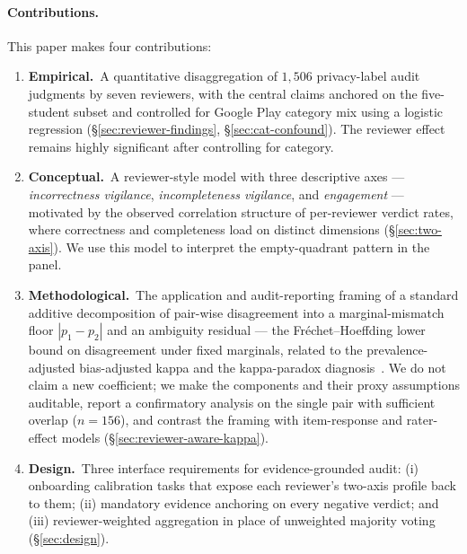 \documentclass[11pt,a4paper]{article}
\begin{document}
\paragraph{Contributions.}
This paper makes four contributions:
%
\begin{enumerate}[leftmargin=*,topsep=2pt,itemsep=2pt]
\item \textbf{Empirical.}\ A quantitative disaggregation of $1{,}506$
       privacy-label audit judgments by seven reviewers, with the
       central claims anchored on the five-student subset and
       controlled for Google Play category mix using a logistic
       regression (\S\ref{sec:reviewer-findings},
       \S\ref{sec:cat-confound}). The reviewer effect remains highly
       significant after controlling for category.
\item \textbf{Conceptual.}\ A reviewer-style model with three
       descriptive axes --- \emph{incorrectness vigilance},
       \emph{incompleteness vigilance}, and \emph{engagement} ---
       motivated by the observed correlation structure of per-reviewer
       verdict rates, where correctness and completeness load on
       distinct dimensions (\S\ref{sec:two-axis}). We use this model
       to interpret the empty-quadrant pattern in the panel.
\item \textbf{Methodological.}\ The application and audit-reporting
       framing of a standard additive decomposition of pair-wise
       disagreement into a marginal-mismatch floor $|p_1-p_2|$ and an
       ambiguity residual --- the Fr\'echet--Hoeffding lower bound on
       disagreement under fixed marginals, related to the
       prevalence-adjusted bias-adjusted kappa
       \citep{byrt1993bias} and the kappa-paradox
       diagnosis~\citep{feinstein1990high}. We do not claim a new
       coefficient; we make the components and their proxy
       assumptions auditable, report a confirmatory analysis on the
       single pair with sufficient overlap ($n=156$), and contrast
       the framing with item-response and rater-effect models
       \citep{dawid1979maximum,passonneau2014benefits}
       (\S\ref{sec:reviewer-aware-kappa}).
\item \textbf{Design.}\ Three interface requirements for
       evidence-grounded audit: (i) onboarding calibration tasks that
       expose each reviewer's two-axis profile back to them;
       (ii) mandatory evidence anchoring on every negative verdict;
       and (iii) reviewer-weighted aggregation in place of unweighted
       majority voting (\S\ref{sec:design}).
\end{enumerate}
\end{document}
